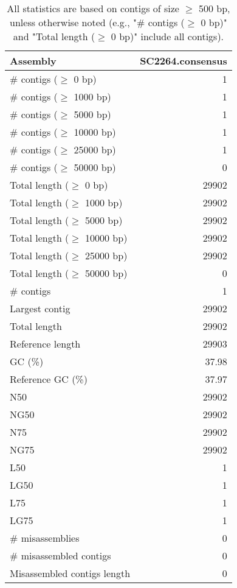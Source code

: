 \documentclass[12pt,a4paper]{article}
\begin{document}
\begin{table}[ht]
\begin{center}
\caption{All statistics are based on contigs of size $\geq$ 500 bp, unless otherwise noted (e.g., "\# contigs ($\geq$ 0 bp)" and "Total length ($\geq$ 0 bp)" include all contigs).}
\begin{tabular}{|l*{1}{|r}|}
\hline
Assembly & SC2264.consensus \\ \hline
\# contigs ($\geq$ 0 bp) & 1 \\ \hline
\# contigs ($\geq$ 1000 bp) & 1 \\ \hline
\# contigs ($\geq$ 5000 bp) & 1 \\ \hline
\# contigs ($\geq$ 10000 bp) & 1 \\ \hline
\# contigs ($\geq$ 25000 bp) & 1 \\ \hline
\# contigs ($\geq$ 50000 bp) & 0 \\ \hline
Total length ($\geq$ 0 bp) & 29902 \\ \hline
Total length ($\geq$ 1000 bp) & 29902 \\ \hline
Total length ($\geq$ 5000 bp) & 29902 \\ \hline
Total length ($\geq$ 10000 bp) & 29902 \\ \hline
Total length ($\geq$ 25000 bp) & 29902 \\ \hline
Total length ($\geq$ 50000 bp) & 0 \\ \hline
\# contigs & 1 \\ \hline
Largest contig & 29902 \\ \hline
Total length & 29902 \\ \hline
Reference length & 29903 \\ \hline
GC (\%) & 37.98 \\ \hline
Reference GC (\%) & 37.97 \\ \hline
N50 & 29902 \\ \hline
NG50 & 29902 \\ \hline
N75 & 29902 \\ \hline
NG75 & 29902 \\ \hline
L50 & 1 \\ \hline
LG50 & 1 \\ \hline
L75 & 1 \\ \hline
LG75 & 1 \\ \hline
\# misassemblies & 0 \\ \hline
\# misassembled contigs & 0 \\ \hline
Misassembled contigs length & 0 \\ \hline

\end{tabular}
\end{center}
\end{table}
\end{document}
